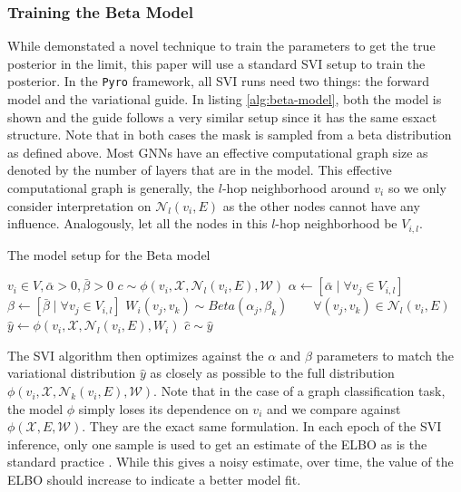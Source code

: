 \subsubsection{Training the Beta Model}
While \cite{bolla_estimating_2017} demonstated a novel technique to train the parameters to get the true posterior in the limit, this paper will use a standard SVI setup to train the posterior. In the \verb|Pyro| framework, all SVI runs need two things: the forward model and the variational guide. In listing \ref{alg:beta-model}, both the model is shown and the guide follows a very similar setup since it has the same esxact structure. Note that in both cases the mask is sampled from a beta distribution as defined above. Most GNNs have an effective computational graph size as denoted by the number of layers that are in the model. This effective computational graph is generally, the $l$-hop neighborhood around $v_i$ so we only consider interpretation on $\mathcal{N}_l(v_i, E)$ as the other nodes cannot have any influence. Analogously, let all the nodes in this $l$-hop neighborhood be $V_{i,l}$.
\begin{algorithm}[h]
	\centering
	\caption{The model setup for the Beta model}
	\label{alg:beta-model}
	\begin{algorithmic}
		\Require $v_i \in V, \bar{\alpha} > 0, \bar{\beta} > 0$
		\Require $c \sim \phi(v_i, \mathcal{X}, \mathcal{N}_l(v_i, E), \mathcal{W})$
		\State $\alpha \gets [\bar{\alpha} \mid \forall v_j \in V_{i,l}]$
		\State $\beta \gets [\bar{\beta} \mid \forall v_j \in V_{i, l}]$
		\State $W_i(v_j, v_k) \sim Beta(\alpha_j, \beta_k) \quad\quad \forall (v_j, v_k) \in \mathcal{N}_l(v_i, E)$
		\State $\hat{y} \gets \phi(v_i, \mathcal{X}, \mathcal{N}_l(v_i, E), W_i)$
		\State $\hat{c} \sim \hat{y}$
	\end{algorithmic}
\end{algorithm}

The SVI algorithm then optimizes against the $\alpha$ and $\beta$ parameters to match the variational distribution $\hat{y}$ as closely as possible to the full distribution $\phi(v_i, \mathcal{X}, \mathcal{N}_k(v_i, E), \mathcal{W})$. Note that in the case of a graph classification task, the model $\phi$ simply loses its dependence on $v_i$ and we compare against $\phi(\mathcal{X}, E, \mathcal{W})$. They are the exact same formulation. In each epoch of the SVI inference, only one sample is used to get an estimate of the ELBO as is the standard practice \cite{jospin_hands-bayesian_2022}. While this gives a noisy estimate, over time, the value of the ELBO should increase to indicate a better model fit.

